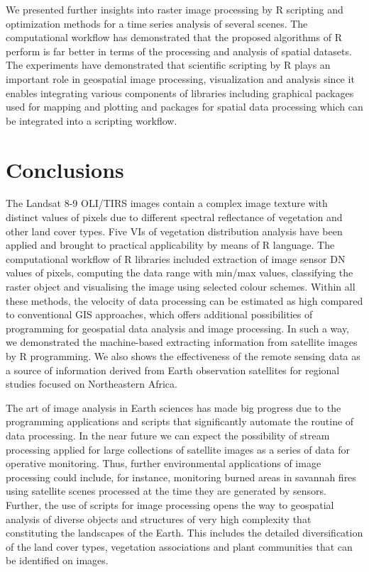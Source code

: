 \documentclass[jimaging,article,submit,pdftex,moreauthors]{Definitions/mdpi}
\begin{document}
We presented further insights into raster image processing by R scripting and optimization methods for a time series analysis of several scenes. The computational workflow has demonstrated that the proposed algorithms of R perform is far better in terms of the processing and analysis of spatial datasets. The experiments have demonstrated that scientific scripting by R plays an important role in geospatial image processing, visualization and analysis since it enables integrating various components of libraries including graphical packages used for mapping and plotting and packages for spatial data processing which can be integrated into a scripting workflow.  

\section{Conclusions}

The Landsat 8-9 OLI/TIRS images contain a complex image texture with distinct values of pixels due to different spectral reflectance of vegetation and other land cover types. Five VIs of vegetation distribution analysis have been applied and brought to practical applicability by means of R language. The computational workflow of R libraries included extraction of image sensor DN values of pixels, computing the data range with min/max values, classifying the raster object and visualising the image using selected colour schemes. Within all these methods, the velocity of data processing can be estimated as high compared to conventional GIS approaches, which offers additional possibilities of programming for geospatial data analysis and image processing. In such a way, we demonstrated the machine-based extracting information from satellite images by R programming. We also shows the effectiveness of the remote sensing data as a source of information derived from Earth observation satellites for regional studies focused on Northeastern Africa.

The art of image analysis in Earth sciences has made big progress due to the programming applications and scripts that significantly automate the routine of data processing. In the near future we can expect the possibility of stream processing applied for large collections of satellite images as a series of data for operative monitoring. Thus, further environmental applications of image processing could include, for instance, monitoring burned areas in savannah fires using satellite scenes processed at the time they are generated by sensors. Further, the use of scripts for image processing opens the way to geospatial analysis of diverse objects and structures of very high complexity that constituting the landscapes of the Earth. This includes the detailed diversification of the land cover types, vegetation associations and plant communities that can be identified on images.
\end{document}
